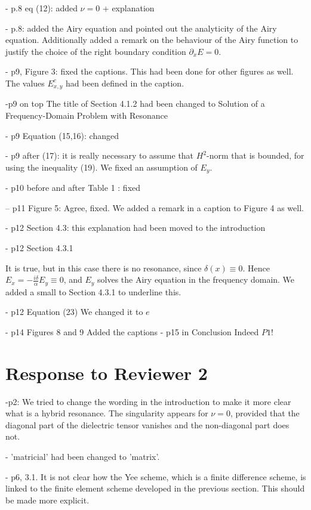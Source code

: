 \documentclass[a4paper,10pt]{article}
\begin{document}
 - p.8 eq (12): added $\nu=0$ + explanation
 
 - p.8: added the Airy equation and pointed out the analyticity of the Airy equation. Additionally added a remark on the behaviour of the Airy function to justify the choice of the right boundary 
 condition $\partial_x E=0$. 
 
 -  p9, Figure 3: fixed the captions. This had been done for other figures as well. The values $E^{c}_{x,y}$ had been defined in the caption.
 
 -p9 on top
  The title of Section 4.1.2 had been changed to Solution of a Frequency-Domain Problem with Resonance
  
 - p9 Equation (15,16): changed  

 - p9 after (17): it is really necessary to assume that $H^2$-norm that is bounded, for using the inequality (19). 
 We fixed an assumption of $E_y$.


  
 - p10 before and after Table 1 : fixed
 
 -- p11 Figure 5:
Agree, fixed. We added a remark in a caption to Figure 4 as well.



- p12 Section 4.3: this explanation had been moved to the introduction



- p12 Section 4.3.1

  It is true, but in this case there is no resonance, since $\delta(x)\equiv 0$. Hence $E_x=-\frac{i\delta}{\alpha}E_y\equiv 0$, 
  and $E_y$ solves the Airy equation in the frequency domain. We added a small to Section 4.3.1 to underline this. 

  
- p12 Equation (23)
We changed it to $e$
  
- p14 Figures 8 and 9
Added the captions  
- p15 in Conclusion
  Indeed $P1$!
  

\section{Response to  Reviewer 2}
 
-p2:  We tried to change the wording in the introduction to make it more clear what is a hybrid resonance. 
The singularity appears for $\nu=0$, provided that the diagonal part of the dielectric tensor vanishes and the non-diagonal part does not. 

- 'matricial' had been changed to 'matrix'.

- p6, 3.1. It is not clear how the Yee scheme, which is a finite difference scheme, is linked to the
finite element scheme developed in the previous section. This should be made more explicit.
\end{document}
